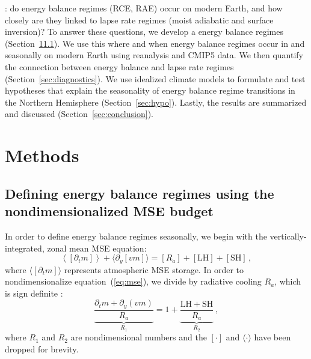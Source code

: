 \documentclass{ametsocV5}
\begin{document}
:  do energy balance regimes (RCE, RAE) occur on modern Earth, and how closely are they linked to lapse rate regimes (moist adiabatic and surface inversion)? To answer these questions, we develop a  energy balance regimes (Section~\ref{sec:methods}\ref{subsec:mse}). We use this  where and when energy balance regimes occur in  and seasonally on modern Earth using reanalysis and CMIP5 data. We then quantify the connection between energy balance and lapse rate regimes (Section~\ref{sec:diagnostics}). We use idealized climate models to formulate and test hypotheses that explain the seasonality of energy balance regime transitions in the Northern Hemisphere (Section~\ref{sec:hypo}). Lastly, the results are summarized and discussed (Section~\ref{sec:conclusion}).

\section{Methods}\label{sec:methods}
    \subsection{Defining energy balance regimes using the nondimensionalized MSE budget} \label{subsec:mse}
    In order to define energy balance regimes seasonally, we begin with the vertically-integrated, zonal mean MSE equation:
    \begin{equation} \label{eq:mse}
        \left\langle\left[\partial_t m\right]\right\rangle + \langle\partial_y [vm]\rangle = [R_{a}] + \mathrm{[LH]+[SH]} \, ,
    \end{equation}
    where $\langle[\partial_t m]\rangle$ represents atmospheric MSE storage. In order to nondimensionalize equation~(\ref{eq:mse}), we divide by radiative cooling $R_a$, which is sign definite :
    \begin{equation}
        {\underbrace{\frac{\partial_t m + \partial_y (vm)}{R_{a}}}_{R_1}} = 1 + {\underbrace{\frac{\mathrm{LH+SH}}{R_{a}}}_{R_2}} \, ,
    \end{equation}
    where $R_1$ and $R_2$ are nondimensional numbers and the $[\cdot]$ and $\langle\cdot\rangle$ have been dropped for brevity. 
\end{document}
